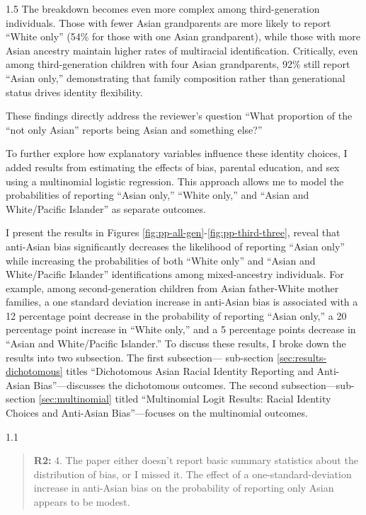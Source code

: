 \documentclass[12pt,english]{article}
\newcommand{\rrquote}{1.1}
\newcommand{\rrxspc}{1.5}
\begin{document}
\begin{refsection}
\begin{spacing}{\rrxspc}
            The breakdown becomes even more complex among third-generation individuals. Those with fewer Asian grandparents are more likely to report ``White only'' (54\% for those with one Asian grandparent), while those with more Asian ancestry maintain higher rates of multiracial identification. Critically, even among third-generation children with four Asian grandparents, 92\% still report ``Asian only,'' demonstrating that family composition rather than generational status drives identity flexibility.

            These findings directly address the reviewer's question ``What proportion of the “not only Asian” reports being Asian and something else?'' 

            To further explore how explanatory variables influence these identity choices, I added results from estimating the effects of bias, parental education, and sex using a multinomial logistic regression. This approach allows me to model the probabilities of reporting ``Asian only,'' ``White only,'' and ``Asian and White/Pacific Islander'' as separate outcomes.

            I present the results in Figures \ref{fig:pp-all-gen}-\ref{fig:pp-third-three}, reveal that anti-Asian bias significantly decreases the likelihood of reporting ``Asian only'' while increasing the probabilities of both ``White only'' and ``Asian and White/Pacific Islander'' identifications among mixed-ancestry individuals. For example, among second-generation children from Asian father-White mother families, a one standard deviation increase in anti-Asian bias is associated with a 12 percentage point decrease in the probability of reporting ``Asian only,'' a 20 percentage point increase in ``White only,'' and a 5 percentage points decrease in ``Asian and White/Pacific Islander.'' To discuss these results, I broke down the results into two subsection. The first subsection--- sub-section \ref{sec:results-dichotomous} titles ``Dichotomous Asian Racial Identity Reporting and Anti-Asian Bias''---discusses the dichotomous outcomes. The second subsection---sub-section \ref{sec:multinomial} titled ``Multinomial Logit Results: Racial Identity Choices and Anti-Asian Bias''---focuses on the multinomial outcomes.
    \end{spacing}

    \begin{spacing}{\rrquote}
        \begin{quotation}
        \textbf{R2: } 4. The paper either doesn’t report basic summary statistics about the distribution of bias, or I missed it. The effect of a one-standard-deviation increase in anti-Asian bias on the probability of reporting only Asian appears to be modest.
        \end{quotation}
        \end{spacing}
        

\end{refsection}
\end{document}
